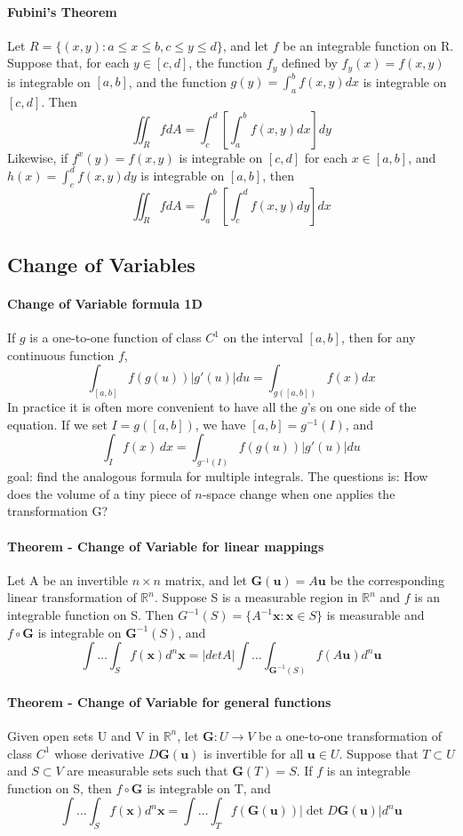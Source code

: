 \documentclass[11pt]{article}
\newcommand{\tb}[1]{\textbf{#1}}
\newcommand{\real}[0]{\mathbb{R}}
\newcommand{\func}[3]{\tb{#1}: {#2} \rightarrow {#3} }
\newcommand{\vx}[0]{\tb{x}}
\begin{document}
\paragraph{Fubini's Theorem} Let $R = \{(x,y): a\leq x\leq b, c \leq y \leq d \}$, and let $f$ be an integrable function on R. Suppose that, for each $y \in [c, d]$, the function $f_y$ defined by $f_y(x) = f(x, y)$ is integrable on $[a,b]$, and the function $g(y) = \int_a^bf(x,y)dx$ is integrable on $[c,d]$. Then
$$\iint_R fdA = \int_c^d\left[\int_a^b f(x,y)dx\right]dy$$
Likewise, if $f^x(y) = f(x,y)$ is integrable on $[c,d]$ for each $x \in [a,b]$, and $h(x) = \int_c^df(x,y)dy$ is integrable on $[a,b]$, then
$$\iint_R fdA = \int_a^b\left[\int_c^d f(x,y)dy\right]dx$$

\subsection{Change of Variables}
\paragraph{Change of Variable formula 1D} If $g$ is a one-to-one function of class $C^1$ on the interval $[a, b]$, then for any continuous function $f$,
$$\int_{[a,b]} f(g(u))|g'(u)|du = \int_{g([a,b])}f(x)dx$$
In practice it is often more convenient to have all the $g$'s on one side of the equation. If we set $I = g([a, b])$, we have $[a, b] = g^{-1}(I)$, and
$$\int_I f(x) \, dx = \int_{g^{-1}(I)}f(g(u))|g'(u)|du$$
goal: find the analogous formula for multiple integrals. The questions is: How does the volume of a tiny piece of $n$-space change when one applies the transformation G?
\paragraph{Theorem - Change of Variable for linear mappings} Let A be an invertible $n \times n$ matrix, and let $\tb{G}(\tb{u}) = A\tb{u}$ be the corresponding linear transformation of $\real^n$. Suppose S is a measurable region in $\real^n$ and $f$ is an integrable function on S. Then $G^{-1}(S) = \{A^{-1}\tb{x}: \tb{x} \in S\}$ is measurable and $f \circ \tb{G}$ is integrable on $\tb{G}^{-1}(S)$, and
    $$ \int \hdots \int_S f(\vx)d^n\vx = |det A| \int \hdots \int_{\tb{G}^{-1}(S)}f(A\tb{u})d^n\tb{u}$$

\paragraph{Theorem - Change of Variable for general functions} Given open sets U and V in $\real^n$, let $\func{G}{U}{V}$ be a one-to-one transformation of class $C^1$ whose derivative $D\tb{G}(\tb{u})$ is invertible for all $\tb{u} \in U$. Suppose that $T \subset U$ and $S \subset V$ are measurable sets such that $\tb{G}(T) = S$. If $f$ is an integrable function on S, then $f \circ \tb{G}$ is integrable on T, and 
    $$ \int \hdots \int_S f(\vx)d^n\vx = \int \hdots \int_{T}f(\tb{G}(\tb{u}))|\det D\tb{G}(\tb{u})|d^n\tb{u}$$
    
\end{document}
